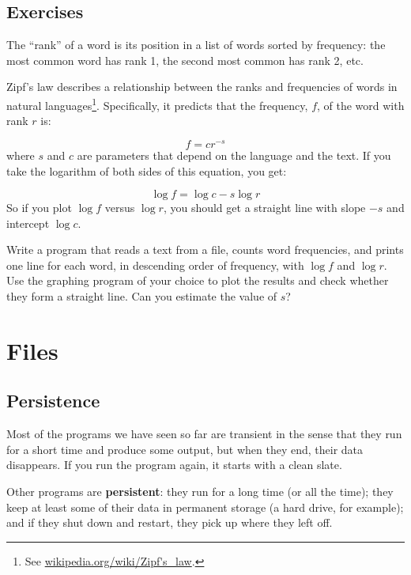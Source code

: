 \documentclass[10pt]{book}
\begin{document}
\section{Exercises}

\begin{ex}


The ``rank'' of a word is its position in a list of words
sorted by frequency: the most common word has rank 1, the
second most common has rank 2, etc.

Zipf's law describes a relationship between the ranks and frequencies
of words in natural languages\footnote{See
  \url{wikipedia.org/wiki/Zipf's_law}.}.  Specifically, it
predicts that the frequency, $f$, of the word with rank $r$ is:

\[ f = c r^{-s} \]
%
where $s$ and $c$ are parameters that depend on the language and the
text.  If you take the logarithm of both sides of this equation, you
get:


\[ \log f = \log c - s \log r \]
%
So if you plot $\log f$ versus $\log r$, you should get
a straight line with slope $-s$ and intercept $\log c$.

Write a program that reads a text from a file, counts
word frequencies, and prints one line
for each word, in descending order of frequency, with
$\log f$ and $\log r$.  Use the graphing program of your
choice to plot the results and check whether they form
a straight line.  Can you estimate the value of $s$?
\end{ex}


\chapter{Files}



\section{Persistence}


Most of the programs we have seen so far are transient in the
sense that they run for a short time and produce some output,
but when they end, their data disappears.  If you run the program
again, it starts with a clean slate.

Other programs are {\bf persistent}: they run for a long time
(or all the time); they keep at least some of their data
in permanent storage (a hard drive, for example); and
if they shut down and restart, they pick up where they left off.
\end{document}
